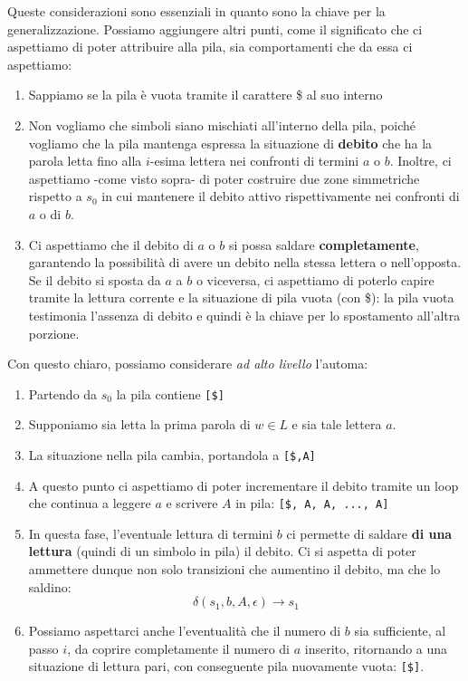 \documentclass[a4paper,10pt]{article}
\begin{document}
{\begin{itemize}[label=, leftmargin=0pt]
\begin{osservazioni}
\begin{itemize}
        \end{itemize}
    Queste considerazioni sono essenziali in quanto sono la chiave per la generalizzazione. Possiamo aggiungere altri punti, come il significato che ci aspettiamo di poter attribuire alla pila, sia comportamenti che da essa ci aspettiamo:
    \begin{enumerate}
        \item Sappiamo se la pila è vuota tramite il carattere \$ al suo interno
        \item Non vogliamo che simboli siano mischiati all'interno della pila, poiché vogliamo che la pila mantenga espressa la situazione di \textbf{debito} che ha la parola letta fino alla $i$-esima lettera nei confronti di termini $a$ o $b$. 
        Inoltre, ci aspettiamo -come visto sopra- di poter costruire due zone simmetriche rispetto a $s_0$ in cui mantenere il debito attivo rispettivamente nei confronti di $a$ o di $b$. 
        \item Ci aspettiamo che il debito di $a$ o $b$ si possa saldare \textbf{completamente}, garantendo la possibilità di avere un debito nella stessa lettera o nell'opposta. Se il debito si sposta da $a$ a $b$ o viceversa, ci aspettiamo di poterlo capire tramite la lettura corrente e la situazione di pila vuota (con \$): la pila vuota testimonia l'assenza di debito e quindi è la chiave per lo spostamento all'altra porzione.
    \end{enumerate}
    Con questo chiaro, possiamo considerare\textit{ ad alto livello }l'automa:
    \begin{enumerate}
        \item Partendo da $s_0$ la pila contiene \texttt{[\$]}
        \item Supponiamo sia letta la prima parola di $w\in L$ e sia tale lettera $a$.
        \item La situazione nella pila cambia, portandola a \texttt{[\$,A]}
        \item A questo punto ci aspettiamo di poter incrementare il debito tramite un loop che continua a leggere $a$ e scrivere $A$ in pila: \texttt{[\$, A, A, ..., A]}
        \item In questa fase, l'eventuale lettura di termini $b$ ci permette di saldare \textbf{di una lettura} (quindi di un simbolo in pila) il debito. Ci si aspetta di poter ammettere dunque non solo transizioni che aumentino il debito, ma che lo saldino:
        $$\delta(s_1,b,A,\epsilon)\rightarrow s_1$$
        \item Possiamo aspettarci anche l'eventualità che il numero di $b$ sia sufficiente, al passo $i$, da coprire completamente il numero di $a$ inserito, ritornando a una situazione di lettura pari, con conseguente pila nuovamente vuota: \texttt{[\$]}. 

\end{enumerate}
\end{osservazioni}
\end{itemize}}
\end{document}
